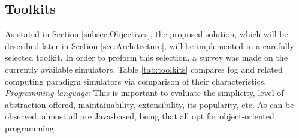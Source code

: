 \subsection{Toolkits}
\label{sec:Toolkits}
\noindent As stated in Section \ref{subsec:Objectives}, the proposed solution, which will be described later in Section \ref{sec:Architecture}, will be implemented in a carefully selected toolkit. In order to preform this selection, a survey was made on the currently available simulators. Table \ref{tab:toolkits} compares fog and related computing paradigm simulators via comparison of their characteristics.\\
\noindent\tab \textit{Programming language}: This is important to evaluate the simplicity, level of abstraction offered, maintainability, extensibility, its popularity, etc. As can be observed, almost all are Java-based, being that all opt for object-oriented programming.\\
